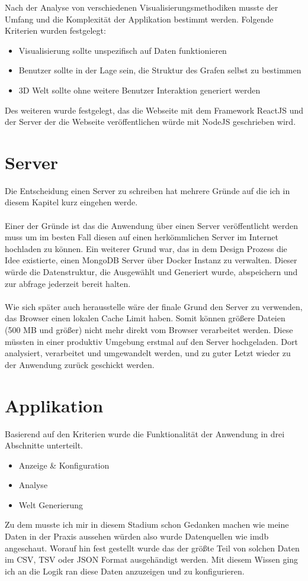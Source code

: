 
Nach der Analyse von verschiedenen Visualisierungsmethodiken musste der Umfang und die Komplexität der Applikation bestimmt werden.
Folgende Kriterien wurden festgelegt:
\begin{itemize}
    \item Visualisierung sollte unspezifisch auf Daten funktionieren
    \item Benutzer sollte in der Lage sein, die Struktur des Grafen selbst zu bestimmen
    \item 3D Welt sollte ohne weitere Benutzer Interaktion generiert werden
\end{itemize}
Des weiteren wurde festgelegt, das die Webseite mit dem Framework ReactJS und der Server der die Webseite veröffentlichen würde mit NodeJS geschrieben
wird.

\section{Server}
Die Entscheidung einen Server zu schreiben hat mehrere Gründe auf die ich in diesem Kapitel kurz eingehen werde. \\ \\
Einer der Gründe ist das die Anwendung über einen Server veröffentlicht werden muss um im besten Fall diesen auf einen herkömmlichen Server im
Internet hochladen zu können. Ein weiterer Grund war, das in dem Design Prozess die Idee existierte, einen MongoDB Server über Docker Instanz
zu verwalten. Dieser würde die Datenstruktur, die Ausgewählt und Generiert wurde, abspeichern und zur abfrage jederzeit bereit halten. \\ \\
Wie sich später auch herausstelle wäre der finale Grund den Server zu verwenden, das Browser einen lokalen Cache Limit haben. Somit können
größere Dateien (500 MB und größer) nicht mehr direkt vom Browser verarbeitet werden. Diese müssten in einer produktiv Umgebung erstmal auf
den Server hochgeladen. Dort analysiert, verarbeitet und umgewandelt werden, und zu guter Letzt wieder zu der Anwendung zurück geschickt
werden.
\newpage
\section{Applikation}
Basierend auf den Kriterien wurde die Funktionalität der Anwendung in drei Abschnitte unterteilt.
\begin{itemize}
    \item Anzeige \& Konfiguration
    \item Analyse
    \item Welt Generierung
\end{itemize}
Zu dem musste ich mir in diesem Stadium schon Gedanken machen wie meine Daten in der Praxis aussehen würden also wurde Datenquellen wie
imdb angeschaut. Worauf hin fest gestellt wurde das der größte Teil von solchen Daten im CSV, TSV oder JSON Format ausgehändigt werden. Mit
diesem Wissen ging ich an die Logik ran diese Daten anzuzeigen und zu konfigurieren.


